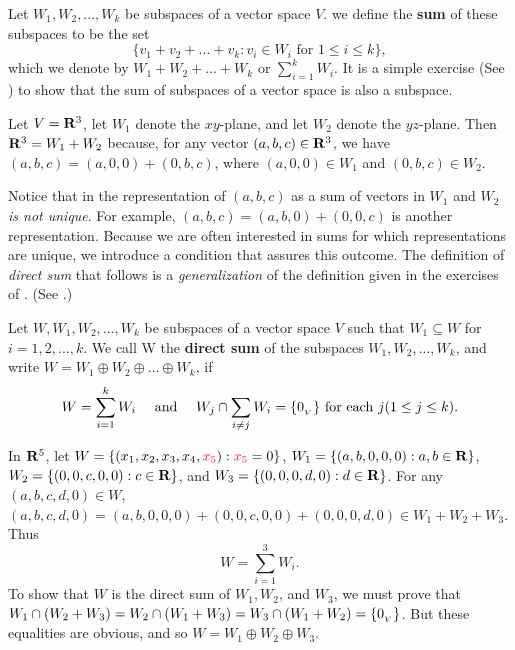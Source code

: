 \begin{definition} \label{def 5.8}
Let \(W_1, W_2, ..., W_k\) be subspaces of a vector space \(V\). we define the \textbf{sum} of these subspaces to be the set
\[
    \{ v_1 + v_2 + ... + v_k : v_i \in W_i \text{ for } 1 \le i \le k \},
\]
which we denote by \(W_1 + W_2 + ... + W_k\) or \(\sum_{i = 1}^k W_i\).
It is a simple exercise (See ) to show that the sum of subspaces of a vector space is also a subspace.
\end{definition}

\begin{example} \label{example 5.2.8}
Let \(V = \mathbf{R}^3\), let \(W_1\) denote the \(xy\)-plane, and let \(W_2\) denote the \(yz\)-plane.
Then \(\mathbf{R}^3 = W_1 + W_2\) because, for any vector \((a, b, c) \in \mathbf{R}^3\),
we have \((a, b, c) = (a, 0, 0) + (0, b, c)\), where \((a, 0, 0) \in W_1\) and \((0, b, c) \in W_2\).
\end{example}

Notice that in  the representation of \((a, b, c)\) as a sum of vectors in \(W_1\) and \(W_2\) \emph{is not unique}.
For example, \((a, b, c) = (a, b, 0) + (0, 0, c)\) is
another representation.
Because we are often interested in sums for which representations are unique, we introduce a condition that assures this outcome.
The definition of \emph{direct sum} that follows is a \emph{generalization} of the definition given in the exercises of .
(See .)

\begin{definition} \label{def 5.9}
Let \(W, W_1, W_2, ..., W_k\) be subspaces of a vector space \(V\) such that \(W_1 \subseteq W\) for \(i = 1, 2, ..., k\).
We call W the \textbf{direct sum} of the subspaces \(W_1, W_2, ..., W_k\), and write \(W = W_1 \oplus W_2 \oplus ... \oplus W_k\), if
\[
    W = \sum_{i = 1}^k W_i \quad \text{ and } \quad W_j \cap \sum_{i \ne j} W_i = \{ 0_{_V} \} \text{ for each } j (1 \le j \le k).
\]
\end{definition}

\begin{example} \label{example 5.2.9}
In \(\mathbf{R}^5\), let \(W = \{(x_1, x_2, x_3, x_4, \RED{x_5}) : \RED{x_5} = 0 \}\),
\(W_1 = \{(a, b, 0, 0, 0): a, b \in \mathbf{R} \}\), \(W_2 = \{ (0, 0, c, 0, 0): c \in \mathbf{R}\}\),
and \(W_3 = \{(0, 0, 0, d, 0): d \in \mathbf{R} \}\).
For any \((a, b, c, d, 0) \in W\),
\((a, b, c, d, 0) = (a, b, 0, 0, 0) + (0, 0, c, 0, 0) + (0, 0, 0, d, 0) \in W_1 + W_2 + W_3\).
Thus
\[
    W = \sum_{i = 1}^3 W_i.
\]
To show that \(W\) is the direct sum of \(W_1, W_2\), and \(W_3\), we must prove that \(W_1 \cap (W_2 + W_3) = W_2 \cap (W_1 + W_3) = W_3 \cap (W_1 + W_2) = \{ 0_{_V} \}\).
But these equalities are obvious, and so \(W = W_1 \oplus W_2 \oplus W_3\).
\end{example}


